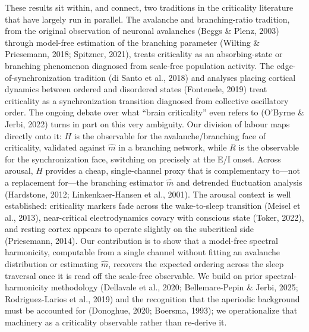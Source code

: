 \documentclass[11pt]{article}
\begin{document}
These results sit within, and connect, two traditions in the criticality literature that have largely run in parallel. The avalanche and branching-ratio tradition, from the original observation of neuronal avalanches (Beggs \& Plenz, 2003) through model-free estimation of the branching parameter (Wilting \& Priesemann, 2018; Spitzner, 2021), treats criticality as an absorbing-state or branching phenomenon diagnosed from scale-free population activity. The edge-of-synchronization tradition (di Santo et al., 2018) and analyses placing cortical dynamics between ordered and disordered states (Fontenele, 2019) treat criticality as a synchronization transition diagnosed from collective oscillatory order. The ongoing debate over what ``brain criticality'' even refers to (O'Byrne \& Jerbi, 2022) turns in part on this very ambiguity. Our division of labour maps directly onto it: $H$ is the observable for the avalanche/branching face of criticality, validated against $\hat m$ in a branching network, while $R$ is the observable for the synchronization face, switching on precisely at the E/I onset. Across arousal, $H$ provides a cheap, single-channel proxy that is complementary to---not a replacement for---the branching estimator $\hat m$ and detrended fluctuation analysis (Hardstone, 2012; Linkenkaer-Hansen et al., 2001). The arousal context is well established: criticality markers fade across the wake-to-sleep transition (Meisel et al., 2013), near-critical electrodynamics covary with conscious state (Toker, 2022), and resting cortex appears to operate slightly on the subcritical side (Priesemann, 2014). Our contribution is to show that a model-free spectral harmonicity, computable from a single channel without fitting an avalanche distribution or estimating $\hat m$, recovers the expected ordering across the sleep traversal once it is read off the scale-free observable. We build on prior spectral-harmonicity methodology (Dellavale et al., 2020; Bellemare-Pepin \& Jerbi, 2025; Rodriguez-Larios et al., 2019) and the recognition that the aperiodic background must be accounted for (Donoghue, 2020; Boersma, 1993); we operationalize that machinery as a criticality observable rather than re-derive it.
\end{document}
